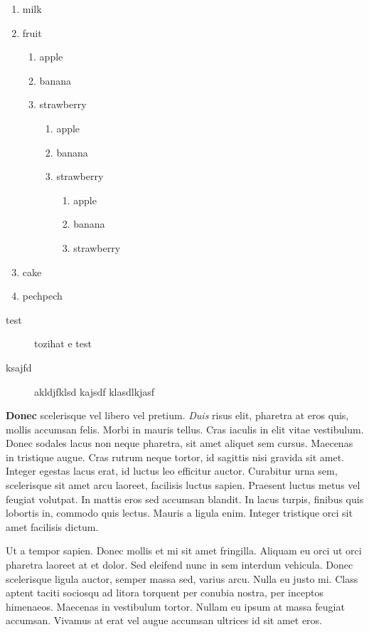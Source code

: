 \documentclass[a4paper,12pt]{article}
\begin{document}
	\begin{enumerate}
		\item milk
		\item fruit
		\begin{enumerate}
			\item apple
			\item banana
			\item strawberry
			\begin{enumerate}
				\item apple
				\item banana
				\item strawberry
				\begin{enumerate}
					\item apple
					\item banana
					\item strawberry
				\end{enumerate}
			\end{enumerate}
		\end{enumerate}
		\item cake
		\item pechpech
	\end{enumerate}

	\begin{description}
		\item[test] tozihat e test
		\item[ksajfd]  akldjfklsd kajsdf klasdlkjasf 
	\end{description}
	
	\textbf{Donec} scelerisque vel libero vel pretium. \textit{Duis} risus elit, pharetra at eros quis, mollis accumsan felis. Morbi in mauris tellus. Cras iaculis in elit vitae vestibulum. Donec sodales lacus non neque pharetra, sit amet aliquet sem cursus. Maecenas in tristique augue. Cras rutrum neque tortor, id sagittis nisi gravida sit amet. Integer egestas lacus erat, id luctus leo efficitur auctor. Curabitur urna sem, scelerisque sit amet arcu laoreet, facilisis luctus sapien. Praesent luctus metus vel feugiat volutpat. In mattis eros sed accumsan blandit. In lacus turpis, finibus quis lobortis in, commodo quis lectus. Mauris a ligula enim. Integer tristique orci sit amet facilisis dictum.
	
	\begin{flushright}
		\scriptsize
		Ut a tempor sapien. Donec mollis et mi sit amet fringilla. Aliquam eu orci ut orci pharetra laoreet at et dolor. Sed eleifend nunc in sem interdum vehicula. Donec scelerisque ligula auctor, semper massa sed, varius arcu. Nulla eu justo mi. Class aptent taciti sociosqu ad litora torquent per conubia nostra, per inceptos himenaeos. Maecenas in vestibulum tortor. Nullam eu ipsum at massa feugiat accumsan. Vivamus at erat vel augue accumsan ultrices id sit amet eros.
	\end{flushright}
	
\end{document}
